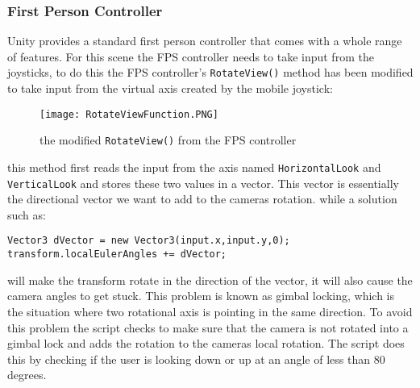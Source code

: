 \subsubsection*{First Person Controller}
Unity provides a standard first person controller that comes with a whole range of features. For this scene the FPS controller needs to take input from the joysticks, to do this the FPS controller's {\tt RotateView()} method has been modified to take input from the virtual axis created by the mobile joystick:
\begin{figure}[H]
\centering
\texttt{[image: RotateViewFunction.PNG]}
\caption{the modified {\tt RotateView()} from the FPS controller}
\end{figure}
this method first reads the input from the axis named {\tt HorizontalLook} and {\tt VerticalLook} and stores these two values in a vector. This vector is essentially the directional vector we want to add to the cameras rotation. while a solution such as:
\begin{verbatim}
Vector3 dVector = new Vector3(input.x,input.y,0);
transform.localEulerAngles += dVector;
\end{verbatim} will make the transform rotate in the direction of the vector, it will also cause the camera angles to get stuck. This problem is known as gimbal locking, which is the situation where two rotational axis is pointing in the same direction. To avoid this problem the script checks to make sure that the camera is not rotated into a gimbal lock and adds the rotation to the cameras local rotation. The script does this by checking if the user is looking down or up at an angle of less than 80 degrees. 



